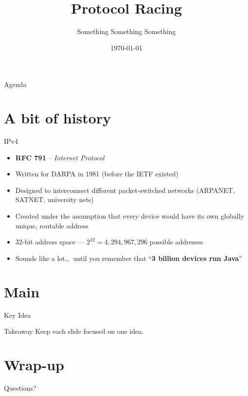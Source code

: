 \documentclass[aspectratio=169]{beamer}
\title[Protocol Racing]{Protocol Racing}
\subtitle{Something Something Something}
\author[Joar Heimonen]{}
\date{\today}
\begin{document}
\begin{frame}
  \titlepage
\end{frame}

\begin{frame}{Agenda}
  \tableofcontents
\end{frame}

\section{A bit of history}
\begin{frame}{IPv4}
  \begin{itemize}
    \item \textbf{RFC 791} – \emph{Internet Protocol}
    \item Written for DARPA in 1981 (before the IETF existed)
    \item Designed to interconnect different packet-switched networks (ARPANET, SATNET, university nets)
    \item Created under the assumption that every device would have its own globally unique, routable address
    \item 32-bit address space — \(2^{32} = 4{,}294{,}967{,}296\) possible addresses
    \item Sounds like a lot\ldots\ until you remember that “\textbf{3 billion devices run Java}”
  \end{itemize}
\end{frame}

\section{Main}
\begin{frame}{Key Idea}
  \begin{block}{Takeaway}
    Keep each slide focused on one idea.
  \end{block}
\end{frame}

\section{Wrap-up}
\begin{frame}[standout]
  Questions?
\end{frame}
\end{document}
